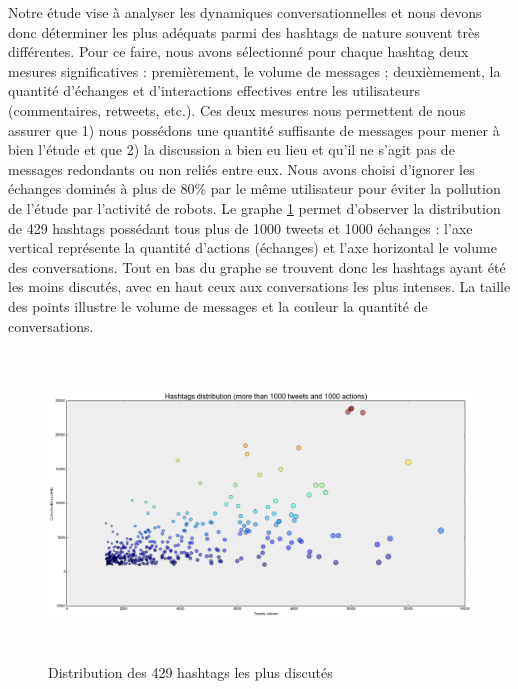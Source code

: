 Notre étude vise à analyser les dynamiques conversationnelles et nous devons donc déterminer les plus adéquats parmi des hashtags de nature souvent très différentes. Pour ce faire, nous avons sélectionné pour chaque hashtag deux mesures significatives : premièrement, le volume de messages ; deuxièmement, la quantité d{\textquoteright}échanges et d{\textquoteright}interactions effectives entre les utilisateurs (commentaires, retweets, etc.). Ces deux mesures nous permettent de nous assurer que 1) nous possédons une quantité suffisante de messages pour mener à bien l{\textquoteright}étude et que 2) la discussion a bien eu lieu et qu{\textquoteright}il ne s{\textquoteright}agit pas de messages redondants ou non reliés entre eux. Nous avons choisi d{\textquoteright}ignorer les échanges dominés à plus de 80\% par le m\^eme utilisateur pour éviter la pollution de l{\textquoteright}étude par l{\textquoteright}activité de robots. Le graphe \ref{fig:distrib-hashtags} permet d{\textquoteright}observer la distribution de 429 hashtags possédant tous plus de 1000 tweets et 1000 échanges : l{\textquoteright}axe vertical représente la quantité d{\textquoteright}actions (échanges) et l{\textquoteright}axe horizontal le volume des conversations. Tout en bas du graphe se trouvent donc les hashtags ayant été les moins discutés, avec en haut ceux aux conversations les plus intenses. La taille des points illustre le volume de messages et la couleur la quantité de conversations.


\begin{figure}[htpb]
    \centering
    \includegraphics[width=6.0114in,height=3.2114in]{figures/chap3/chapitre3-img8.png}
    \caption{Distribution des 429 hashtags les plus discutés}
    \label{fig:distrib-hashtags}
\end{figure}


